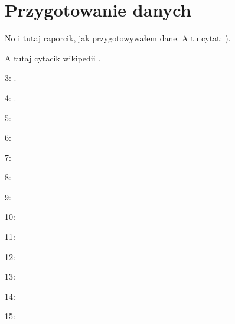 %		
%
%
%


\chapter{Przygotowanie danych}

No i tutaj raporcik, jak przygotowywałem dane. A tu cytat: \cite{Santos09}).

A tutaj cytacik wikipedii \cite{wiki:klas.stat}.

3: \cite{Olson85}.

4: \cite{ferrite.meter}.

5: \cite{Babu13}

6: \cite{Saluja15}

7: \cite{Vitek03.I}

8: \cite{Vitek03.II}

9: \cite{Vasudevan13}

10: \cite{Bhadeshia07}

11: \cite{Badmos13}

12: \cite{Nieves09}

13: \cite{Yang16}

14: \cite{Yoseba08}

15: \cite{Azimi18}

